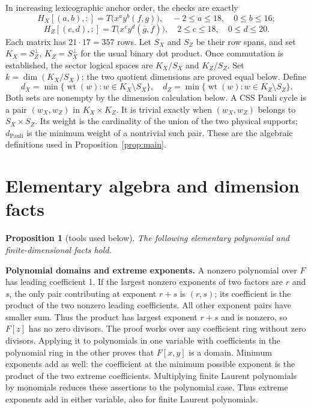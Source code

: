 \documentclass{article}
\newtheorem{proposition}{Proposition}
\DeclareMathOperator{\wt}{wt}
\begin{document}
In increasing lexicographic anchor order, the checks are exactly
\begin{equation}
  H_X[(a,b),{:}]=T\bigl(x^ay^b(f,g)\bigr),
  \quad -2\le a\le 18, \quad 0\le b\le 16;
\end{equation}
\begin{equation}
  H_Z[(c,d),{:}]=T\bigl(x^cy^d(\overline{g},\overline{f})\bigr),
  \quad 2\le c\le 18, \quad 0\le d\le 20.
\end{equation}
Each matrix has \(21\cdot 17=357\) rows.
Let \(S_X\) and \(S_Z\) be their row spans, and set
\(K_X=S_Z^{\perp}\), \(K_Z=S_X^{\perp}\) for the usual binary dot product.
Once commutation is established, the sector logical spaces are
\(K_X/S_X\) and \(K_Z/S_Z\). Set \(k=\dim(K_X/S_X)\); the two quotient
dimensions are proved equal below. Define
\begin{equation}
  d_X=\min\{\wt(w):w\in K_X\setminus S_X\}, \quad
  d_Z=\min\{\wt(w):w\in K_Z\setminus S_Z\}.
\end{equation}
Both sets are nonempty by the dimension calculation below.
A CSS Pauli cycle is a pair \((w_X,w_Z)\) in \(K_X\times K_Z\).
It is trivial exactly when \((w_X,w_Z)\) belongs to \(S_X\times S_Z\).
Its weight is the cardinality of the union of the two physical supports;
\(d_{\text{Pauli}}\) is the minimum weight of a nontrivial such pair. These are
the algebraic definitions used in Proposition~\ref{prop:main}.

\section{Elementary algebra and dimension facts}\label{sec:tools}

\begin{proposition}[tools used below]\label{prop:tools}
  The following elementary polynomial and finite-dimensional facts hold.
\end{proposition}

\textbf{Polynomial domains and extreme exponents.} A nonzero polynomial over
\(F\) has leading coefficient 1. If the largest nonzero exponents of two
factors are \(r\) and \(s\), the only pair contributing at exponent \(r+s\) is
\((r,s)\); its coefficient is the product of the two nonzero leading
coefficients. All other exponent pairs have smaller sum. Thus the product
has largest exponent \(r+s\) and is nonzero, so \(F[z]\) has no zero divisors.
The proof works over any coefficient ring without zero divisors. Applying it to
polynomials in one variable with coefficients in the polynomial ring in
the other proves that \(F[x,y]\) is a domain. Minimum exponents add as well:
the coefficient at the minimum possible exponent is the product of the
two extreme coefficients. Multiplying finite Laurent polynomials by
monomials reduces these assertions to the polynomial case. Thus extreme
exponents add in either variable, also for finite Laurent polynomials.
\end{document}

